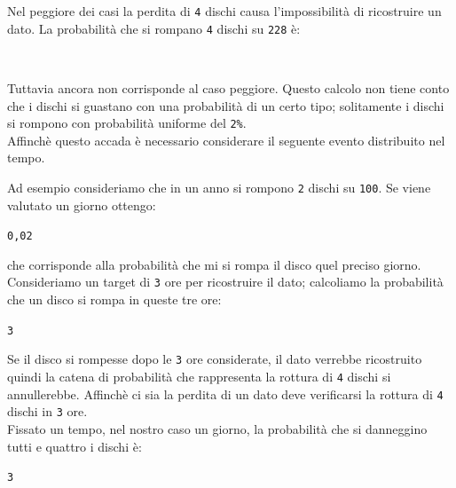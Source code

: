 Nel peggiore dei casi la perdita di \verb"4" dischi causa l'impossibilit\`{a} di ricostruire un dato.
La probabilit\`{a} che si rompano \verb"4" dischi su \verb"228" \`{e}:

\begin{center}
\Large
{} \cdot  {} \cdot {} \cdot {}\\
\end{center}
\normalsize

Tuttavia ancora non corrisponde al caso peggiore. Questo calcolo non tiene conto che i dischi si guastano con una probabilit\`{a} di un certo tipo; solitamente i dischi si rompono con probabilit\`{a} uniforme del \verb"2%".\\

Affinch\`{e} questo accada \`{e} necessario considerare il seguente evento distribuito nel tempo.

Ad esempio consideriamo che in un anno si rompono \verb"2" dischi su \verb"100".
Se viene valutato un giorno ottengo:

\begin{center}
\Large
{} \cdot \normalsize \verb"0,02"\\
\end{center}

che corrisponde alla probabilit\`{a} che mi si rompa il disco quel preciso giorno.\\
Consideriamo un target di \verb"3" ore per ricostruire il dato; calcoliamo la probabilit\`{a} che un disco si rompa in queste tre ore:

\begin{center}
\Large
{} \cdot \normalsize \verb"3"\\
\end{center}

Se il disco si rompesse dopo le \verb"3" ore considerate, il dato verrebbe ricostruito quindi la catena di probabilit\`{a} che rappresenta la rottura di \verb"4" dischi si annullerebbe.
Affinch\`{e} ci sia la perdita di un dato deve verificarsi la rottura di \verb"4" dischi in \verb"3" ore.\\

Fissato un tempo, nel nostro caso un giorno, la probabilit\`{a} che si danneggino tutti e quattro i dischi \`{e}:

\begin{center}
\Large
{} \cdot  {} \cdot {} \cdot {} \cdot {} \cdot \normalsize \verb"3"\\\\
\end{center}
\normalsize

